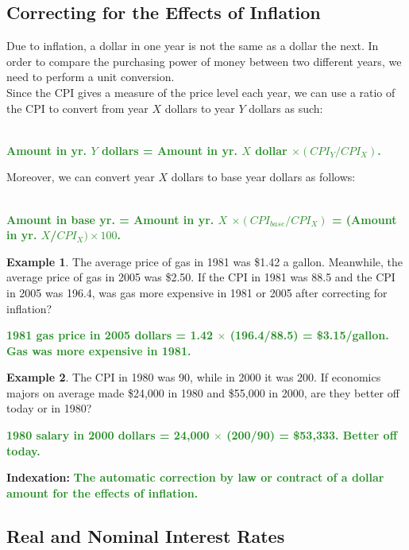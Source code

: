 \documentclass[11pt]{article}\usepackage[]{graphicx}\usepackage[]{color}
\theoremstyle{definition}
\newtheorem{exmp}{Example}[section]
\newcommand{\blank}[1]{}
\newcommand{\ddp}[1]{{\textbf{\textcolor{ForestGreen}{#1}}}}
\newcommand{\defn}[1]{\textbf{#1}}
\begin{document}
\subsection{Correcting for the Effects of Inflation}

Due to inflation, a dollar in one year is not the same as a dollar the next. In order to compare the purchasing power of money between two different years, we need to perform a unit conversion. 
\\

Since the CPI gives a measure of the price level each year, we can use a ratio of the CPI to convert from year $X$ dollars to year $Y$ dollars as such:

\ddp{\\ Amount in yr. $Y$ dollars = Amount in yr. $X$ dollar $\times (CPI_Y/CPI_X)$.\\}
\blank{}
\blank{}


Moreover, we can convert year $X$ dollars to base year dollars as follows:

\ddp{\\ Amount in base yr. = Amount in yr. $X$ $\times (CPI_{base}/CPI_X)$ = (Amount in yr. $X$/$CPI_X) \times 100$.\\}
\blank{}
\blank{}


\begin{exmp} The average price of gas in 1981 was \$1.42 a gallon. Meanwhile, the average price of gas in 2005 was \$2.50. If the CPI in 1981 was 88.5 and the CPI in 2005 was 196.4, was gas more expensive in 1981 or 2005 after correcting for inflation? 
\end{exmp}
\ddp{1981 gas price in 2005 dollars = 1.42 $\times$ (196.4/88.5) = \$3.15/gallon. Gas was more expensive in 1981.}
\blank{}
\blank{}

\begin{exmp}
The CPI in 1980 was 90, while in 2000 it was 200. If economics majors on average made \$24,000 in 1980 and \$55,000 in 2000, are they better off today or in 1980?
\end{exmp}

\ddp{1980 salary in 2000 dollars = 24,000 $\times$ (200/90) = \$53,333. Better off today.\\}
\blank{}

\defn{Indexation:} \ddp{The automatic correction by law or contract of a dollar amount for the effects of inflation.}

\subsection{Real and Nominal Interest Rates}
\end{document}
